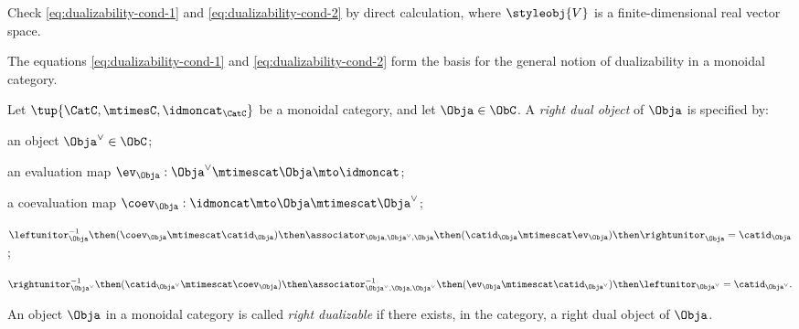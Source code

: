 \begin{gradedexercise}
    \label{ex:VectSnakeEquations}
    Check \cref{eq:dualizability-cond-1} and \cref{eq:dualizability-cond-2} by direct calculation, where $\styleobj{V}$ is a finite-dimensional real vector space.
\end{gradedexercise}




The equations \cref{eq:dualizability-cond-1} and \cref{eq:dualizability-cond-2} form the basis for the general notion of dualizability in a monoidal category.

\begin{ctdefinition}
    \label{def:dualizable-object}
    Let $\tup{\CatC,\mtimesC,\idmoncat_{\CatC}}$ be a monoidal category, and let $\Obja \in \ObC$. A \emph{right dual object} of $\Obja$ is specified by:

    \constit
    \begin{compactenum}
        \item an object $\Obja^\vee \in \ObC$;
        \item an evaluation map $\ev_\Obja: \Obja^\vee \mtimescat \Obja \mto \idmoncat$;
        \item a coevaluation map $\coev_\Obja: \idmoncat \mto \Obja \mtimescat \Obja^\vee$;
    \end{compactenum}

    \condit
    \begin{compactenum}
        \item $\leftunitor_{\Obja}^{-1} \then (\coev_\Obja \mtimescat \catid_\Obja) \then  \associator_{\Obja, \Obja^\vee, \Obja} \then(\catid_\Obja \mtimescat \ev_\Obja) \then \rightunitor_{\Obja} = \catid_\Obja$;
        \item $\rightunitor_{\Obja^\vee}^{-1} \then (\catid_{\Obja^\vee} \mtimescat \coev_\Obja)  \then \associator_{\Obja^\vee, \Obja, \Obja^\vee}^{-1} \then (\ev_\Obja \mtimescat \catid_{\Obja^\vee}) \then \leftunitor_{\Obja^\vee}  = \catid_{\Obja^\vee}.$

    \end{compactenum}
\end{ctdefinition}

\begin{definition}
    An object $\Obja$ in a monoidal category is called \emph{right dualizable} if there exists, in the category, a right dual object of $\Obja$.
\end{definition}

